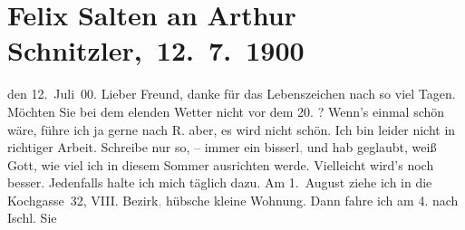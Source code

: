 

         
         \renewcommand{\erwaehntePersonen}{Personen: Felix Salten, Paul Schlenther}
         \renewcommand{\erwaehnteInstitutionen}{Institutionen: Burgtheater}
         \renewcommand{\erwaehnteOrte}{Orte: Bad Ischl, Kochgasse, Reichenau an der Rax, Wien}
         \renewcommand{\erwaehnteWerke}{Werke: Der Schleier der Beatrice. Schauspiel in fünf Akten}
               \section[ Felix Salten an Arthur Schnitzler, 12. 7. 1900]{ Felix Salten an Arthur Schnitzler, 12. 7. 1900}\nopagebreak{}\rehead{ }\begin{ledgroupsized}[t]{13cm}\normalsize\beginnumbering \toendnotes[C]{\smallbreak\pagebreak[2]} 
\toendnotes[C]{\smallbreak}\pstart
           \raggedleft{}{\pb}den 12. Juli 00.\pend
           \pstart
           Lieber Freund, danke für das Lebenszeichen nach so viel Tagen.
               Möchten Sie bei dem elenden Wetter nicht vor dem 20.{ }\label{K_L03306-1v}\label{K_L03306-1h}? Wenn’s einmal
               schön wäre, führe ich ja gerne nach 
               R.
                 aber, es wird nicht schön. Ich
               bin leider nicht in richtiger Arbeit. Schreibe nur so, – immer ein
                  bisserl\textcolor{gray}{,} und hab geglaubt, weiß Gott, wie viel ich in diesem
               Sommer ausrichten werde. Vielleicht wird's noch besser. Jedenfalls halte ich mich
               täglich dazu. Am 1. August ziehe ich in die Kochgasse 32, VIII. Bezirk\textcolor{gray}{,} hübsche kleine Wohnung. Dann fahre ich am 4. nach Ischl. Sie

\end{ledgroupsized}
